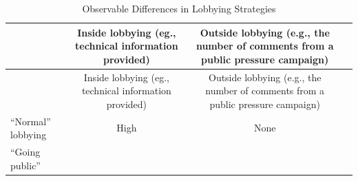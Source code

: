 \documentclass[
      12pt,
        ]{article}
\begin{document}
\begin{longtable}[]{@{}lccc@{}}
\caption{\label{tab:campaigns-patterns} Observable Differences in Lobbying Strategies}\tabularnewline
\toprule
\begin{minipage}[b]{0.19\columnwidth}\raggedright
\strut
\end{minipage} & \begin{minipage}[b]{0.23\columnwidth}\centering
Inside lobbying (eg., technical information provided)\strut
\end{minipage} & \begin{minipage}[b]{0.23\columnwidth}\centering
Outside lobbying (e.g., the number of comments from a public pressure campaign)\strut
\end{minipage} & \begin{minipage}[b]{0.23\columnwidth}\centering
\strut
\end{minipage}\tabularnewline
\midrule
\endfirsthead
\toprule
\begin{minipage}[b]{0.19\columnwidth}\raggedright
\strut
\end{minipage} & \begin{minipage}[b]{0.23\columnwidth}\centering
Inside lobbying (eg., technical information provided)\strut
\end{minipage} & \begin{minipage}[b]{0.23\columnwidth}\centering
Outside lobbying (e.g., the number of comments from a public pressure campaign)\strut
\end{minipage} & \begin{minipage}[b]{0.23\columnwidth}\centering
\strut
\end{minipage}\tabularnewline
\midrule
\endhead
\begin{minipage}[t]{0.19\columnwidth}\raggedright
``Normal'' lobbying\strut
\end{minipage} & \begin{minipage}[t]{0.23\columnwidth}\centering
High\strut
\end{minipage} & \begin{minipage}[t]{0.23\columnwidth}\centering
None\strut
\end{minipage} & \begin{minipage}[t]{0.23\columnwidth}\centering
\strut
\end{minipage}\tabularnewline
\begin{minipage}[t]{0.19\columnwidth}\raggedright
``Going public''\strut
\end{minipage} & \begin{minipage}[t]{0.23\columnwidth}\centering

\end{minipage}
\end{longtable}
\end{document}
